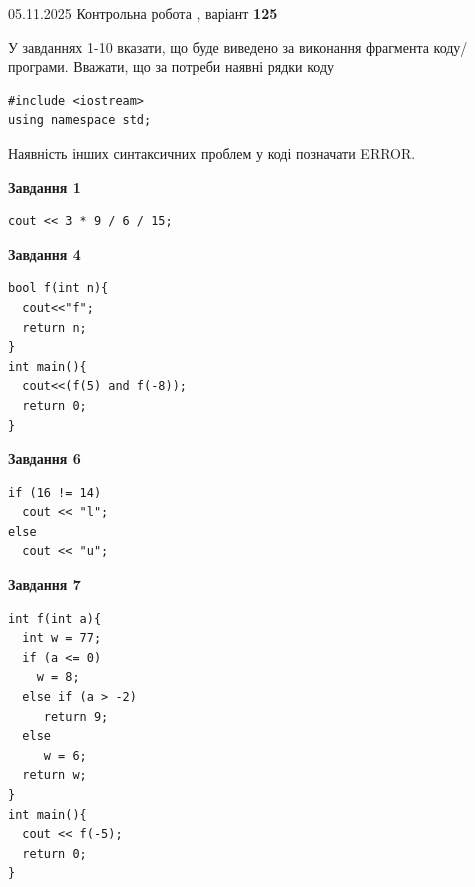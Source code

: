 \documentclass[12pt, ukrainian]{article}
\begin{document}
{\Large{05.11.2025 Контрольна робота , варіант  \No \textbf { 125 }\par}}
{
\begin {large}
У завданнях 1-10 вказати, що буде виведено за виконання фрагмента коду/про\-гра\-ми.
Вважати, що за потреби наявні рядки коду
\begin{verbatim}
#include <iostream>
using namespace std;
\end{verbatim}
Наявність інших синтаксичних проблем у коді позначати ERROR.

\begin{minipage}[t]{7.0cm}

\begin{center}
\textbf{Завдання 1}
\end{center}
\vspace{-8mm}

\begin{verbatim}
cout << 3 * 9 / 6 / 15;
\end{verbatim}



\begin{center}
\textbf{Завдання 4}
\end{center}
\vspace{-8mm}

\begin{verbatim}
bool f(int n){
  cout<<"f";
  return n;
}
int main(){
  cout<<(f(5) and f(-8));
  return 0;
}
\end{verbatim}



\begin{center}
\textbf{Завдання 6}
\end{center}
\vspace{-8mm}

\begin{verbatim}
if (16 != 14)
  cout << "l";
else
  cout << "u";
\end{verbatim}



\begin{center}
\textbf{Завдання 7}
\end{center}
\vspace{-8mm}

\begin{verbatim}
int f(int a){
  int w = 77;
  if (a <= 0)
    w = 8;
  else if (a > -2)
     return 9;
  else
     w = 6;
  return w;
}
int main(){
  cout << f(-5);
  return 0;
}
\end{verbatim}


\end{minipage}
\end{large}}
\end{document}
